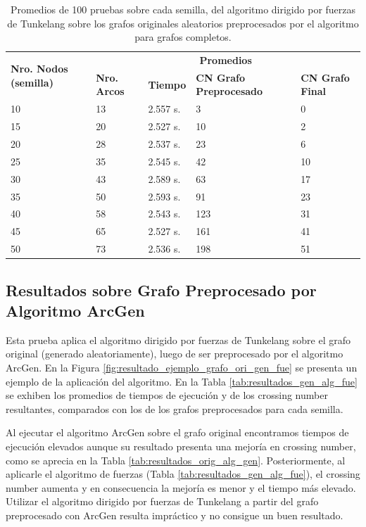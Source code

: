 \begin{table}
	\caption{Promedios de 100 pruebas sobre cada semilla, del algoritmo dirigido por fuerzas de Tunkelang sobre los grafos originales aleatorios preprocesados por el algoritmo para grafos completos.}
	\label{tab:resultados_com_alg_fue}
	\begin{tabularx}{\linewidth}{|p{1.5cm}|p{1.2cm}|p{1.5cm}|X|X|}
		\hline
		\multirow{2}{2cm}{\textbf{Nro. Nodos (semilla)}} & \multicolumn{4}{c|}{\textbf{Promedios}} \\
		\cline{2-5}
		& \textbf{Nro. Arcos} & \textbf{Tiempo} & \textbf{CN Grafo Preprocesado} & \textbf{CN Grafo Final} \\
		\hline
		10 & 13 & 2.557 s. & 3 & 0 \\
		\hline
		15 & 20 & 2.527 s. & 10 & 2 \\
		\hline
		20 & 28 & 2.537 s. & 23 & 6 \\
		\hline
		25 & 35 & 2.545 s. & 42 & 10 \\
		\hline
		30 & 43 & 2.589 s. & 63 & 17 \\
		\hline
		35 & 50 & 2.593 s. & 91 & 23 \\
		\hline
		40 & 58 & 2.543 s. & 123 & 31 \\
		\hline
		45 & 65 & 2.527 s. & 161 & 41 \\
		\hline
		50 & 73 & 2.536 s. & 198 & 51 \\
		\hline
	\end{tabularx}
\end{table}

\subsection{Resultados sobre Grafo Preprocesado por Algoritmo ArcGen}
Esta prueba aplica el algoritmo dirigido por fuerzas de Tunkelang sobre el grafo original (generado aleatoriamente), luego de ser preprocesado por el algoritmo {\sc ArcGen}. En la Figura \ref{fig:resultado_ejemplo_grafo_ori_gen_fue} se presenta un ejemplo de la aplicación del algoritmo. En la Tabla \ref{tab:resultados_gen_alg_fue} se exhiben los promedios de tiempos de ejecución y de los crossing number resultantes, comparados con los de los grafos preprocesados para cada semilla.

Al ejecutar el algoritmo ArcGen sobre el grafo original encontramos tiempos de ejecución elevados aunque su resultado presenta una mejoría en crossing number, como se aprecia en la Tabla \ref{tab:resultados_orig_alg_gen}. Posteriormente, al aplicarle el algoritmo de fuerzas (Tabla \ref{tab:resultados_gen_alg_fue}), el crossing number aumenta y en consecuencia la mejoría es menor y el tiempo más elevado. Utilizar el algoritmo dirigido por fuerzas de Tunkelang a partir del grafo preprocesado con {\sc ArcGen} resulta impráctico y no consigue un buen resultado.

